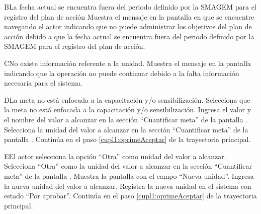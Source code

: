    \begin{UCtrayectoriaA}{B}{La fecha actual se encuentra fuera del periodo definido por la SMAGEM para el registro del plan de acción}
    \UCpaso[\UCsist] Muestra el mensaje  en la pantalla en que se encuentre navegando el actor indicando que no puede administrar los objetivos del plan de acción debido a que la fecha actual se encuentra fuera del periodo definido por la SMAGEM para el registro del plan de acción.
 \end{UCtrayectoriaA}
 
 
\begin{UCtrayectoriaA}{C}{No existe información referente a la unidad.}
	\UCpaso[\UCsist] Muestra el mensaje  en la pantalla  indicando que la operación no puede continuar debido a la falta información necesaria para el sistema.
\end{UCtrayectoriaA}

\begin{UCtrayectoriaA}{D}{La meta no está enfocada a la capacitación y/o sensibilización.}
	\UCpaso[\UCactor] Selecciona que la meta no está enfocada a la capacitación y/o sensibilización. 
	\UCpaso[\UCactor] Ingresa el valor y el nombre del valor a alcanzar en la sección ``Cuantificar meta'' de la pantalla .
	\UCpaso[\UCactor] Selecciona la unidad del valor a alcanzar en la sección ``Cuantificar meta'' de la pantalla . 
	\UCpaso[] Continúa en el paso \ref{cupl1:oprimeAceptar} de la trayectoria principal.
\end{UCtrayectoriaA}

\begin{UCtrayectoriaA}{E}{El actor selecciona la opción ``Otra'' como unidad del valor a alcanzar.}
	\UCpaso[\UCactor] Selecciona ``Otra'' como la unidad del valor a alcanzar en la sección ``Cuantificar meta'' de la pantalla .
	\UCpaso[\UCsist] Muestra la pantalla   con el campo ``Nueva unidad''.
	\UCpaso[\UCactor] Ingresa la nueva unidad del valor a alcanzar.
	\UCpaso[\UCsist] Registra la nueva unidad en el sistema con estado ``Por aprobar''.
	\UCpaso[] Continúa en el paso \ref{cupl1:oprimeAceptar} de la trayectoria principal.
\end{UCtrayectoriaA} 

